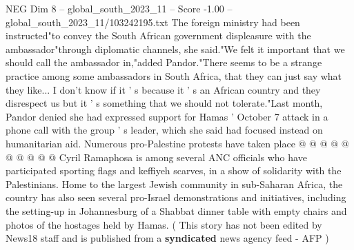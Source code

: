 \begin{textsample}{NEG Dim 8 – global\_south\_2023\_11 – Score -1.00 – global\_south\_2023\_11/103242195.txt}
The foreign ministry had been instructed"to convey the South African government displeasure with the ambassador"through diplomatic channels, she said."We felt it important that we should call the ambassador in,"added Pandor."There seems to be a strange practice among some ambassadors in South Africa, that they can just say what they like...
I don't know if it ' s because it ' s an African country and they disrespect us but it ' s something that we should not tolerate."Last month, Pandor denied she had expressed support for Hamas ' October 7 attack in a phone call with the group ' s leader, which she said had focused instead on humanitarian aid.
Numerous pro-Palestine protests have taken place @ @ @ @ @ @ @ @ @ @ Cyril Ramaphosa is among several ANC officials who have participated sporting flags and keffiyeh scarves, in a show of solidarity with the Palestinians.
Home to the largest Jewish community in sub-Saharan Africa, the country has also seen several pro-Israel demonstrations and initiatives, including the setting-up in Johannesburg of a Shabbat dinner table with empty chairs and photos of the hostages held by Hamas. ( This story has not been edited by News18 staff and is published from a \textbf{syndicated} news agency feed - AFP )

\end{textsample}
